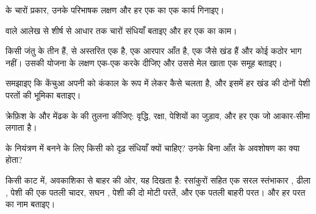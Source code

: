\begin{exercise}[$\star$]\label{exo:b1:body-plans-tissues:3}
 के चारों प्रकार, उनके परिभाषक लक्षण और हर एक का एक कार्य गिनाइए।
\end{exercise}

\begin{exercise}[$\star$]\label{exo:b1:body-plans-tissues:4}
 वाले आलेख से शीर्ष से आधार तक चारों संधियाँ बताइए और हर एक का
काम।
\end{exercise}

\begin{exercise}[$\star\star$]\label{exo:b1:body-plans-tissues:5}
किसी जंतु के तीन  हैं,  से अस्तरित एक  है, एक
आरपार आँत है, एक जैसे खंड हैं और कोई कठोर भाग नहीं। उसकी योजना के लक्षण
एक-एक करके दीजिए और उससे मेल खाता एक समूह बताइए।
\end{exercise}

\begin{exercise}[$\star\star$]\label{exo:b1:body-plans-tissues:6}
समझाइए कि केंचुआ अपनी  को कंकाल के रूप में लेकर कैसे चलता है, और
इसमें हर खंड की दोनों पेशी परतों की भूमिका बताइए।
\end{exercise}

\begin{exercise}[$\star\star$]\label{exo:b1:body-plans-tissues:7}
क्रेफ़िश के  और मेंढक के  की तुलना कीजिए: वृद्धि,
रक्षा, पेशियों का जुड़ाव, और हर एक जो आकार-सीमा लगाता है।
\end{exercise}

\begin{exercise}[$\star\star$]\label{exo:b1:body-plans-tissues:8}
 के नियंत्रण में  बनने के लिए किसी  को दृढ़ संधियाँ
क्यों चाहिए? उनके बिना आँत के अवशोषण का क्या होता?
\end{exercise}

\begin{exercise}[$\star\star$]\label{exo:b1:body-plans-tissues:9}
किसी काट में, अवकाशिका से बाहर की ओर, यह दिखता है: रसांकुरों सहित एक सरल
स्तंभाकार , ढीला , पेशी की एक पतली चादर, सघन ,
पेशी की दो मोटी परतें, और एक पतली बाहरी परत।  और हर परत का नाम
बताइए।
\end{exercise}


